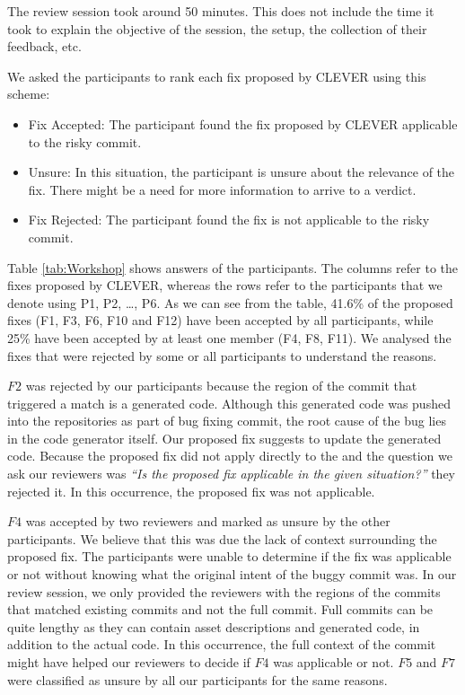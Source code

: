 \documentclass[sigconf]{acmart}
\providecommand{\tightlist}{%
  \setlength{\itemsep}{0pt}\setlength{\parskip}{0pt}}
\begin{document}
The review session took around 50 minutes. This does not include the
time it took to explain the objective of the session, the setup, the
collection of their feedback, etc.

We asked the participants to rank each fix proposed by CLEVER using this
scheme:

\begin{itemize}
\tightlist
\item
  Fix Accepted: The participant found the fix proposed by CLEVER
  applicable to the risky commit.
\item
  Unsure: In this situation, the participant is unsure about the
  relevance of the fix. There might be a need for more information to
  arrive to a verdict.
\item
  Fix Rejected: The participant found the fix is not applicable to the
  risky commit.
\end{itemize}

Table \ref{tab:Workshop} shows answers of the participants. The columns
refer to the fixes proposed by CLEVER, whereas the rows refer to the
participants that we denote using P1, P2, \ldots{}, P6. As we can see
from the table, 41.6\% of the proposed fixes (F1, F3, F6, F10 and F12)
have been accepted by all participants, while 25\% have been accepted by
at least one member (F4, F8, F11). We analysed the fixes that were
rejected by some or all participants to understand the reasons.

\(F2\) was rejected by our participants because the region of the commit
that triggered a match is a generated code. Although this generated code
was pushed into the repositories as part of bug fixing commit, the root
cause of the bug lies in the code generator itself. Our proposed fix
suggests to update the generated code. Because the proposed fix did not
apply directly to the and the question we ask our reviewers was
\emph{``Is the proposed fix applicable in the given situation?''} they
rejected it. In this occurrence, the proposed fix was not applicable.

\(F4\) was accepted by two reviewers and marked as unsure by the other
participants. We believe that this was due the lack of context
surrounding the proposed fix. The participants were unable to determine
if the fix was applicable or not without knowing what the original
intent of the buggy commit was. In our review session, we only provided
the reviewers with the regions of the commits that matched existing
commits and not the full commit. Full commits can be quite lengthy as
they can contain asset descriptions and generated code, in addition to
the actual code. In this occurrence, the full context of the commit
might have helped our reviewers to decide if \(F4\) was applicable or
not. \(F5\) and \(F7\) were classified as unsure by all our participants
for the same reasons.
\end{document}
